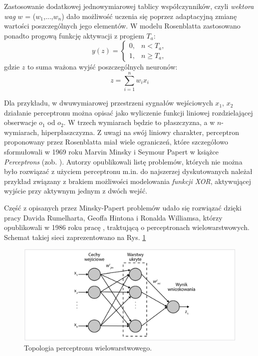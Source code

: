 Zastosowanie dodatkowej jednowymiarowej tablicy współczynników, czyli \textit{wektora wag} $w$ = ($w_1$,...,$w_n$) dało możliwość uczenia się poprzez adaptacyjną zmianę wartości poszczególnych jego elementów. W modelu Rosenblatta zastosowano ponadto progową funkcję aktywacji z progiem $T_a$:
\begin{equation}
y(z)=\begin{cases} 0, & n < T_a, \\ 1, & n \ge T_a, \end{cases}
\end{equation}
gdzie $z$ to suma ważona wyjść poszczególnych neuronów:
\begin{equation}
\label{eqLinActFunc}
z=\sum_{i=1}^{n}w_i x_i
\end{equation}

Dla przykładu, w dwuwymiarowej przestrzeni sygnałów wejściowych {$x_1$, $x_2$}  działanie perceptronu można opisać jako wyliczenie funkcji liniowej rozdzielającej obserwacje $o_1$ od $o_2$. W trzech wymiarach będzie to płaszczyzna, a w $n$-wymiarach, hiperpłaszczyzna. Z uwagi na swój liniowy charakter, perceptron proponowany przez Rosenblatta miał wiele ograniczeń, które szczegółowo sformułowali w 1969 roku Marvin Minsky i Seymour Papert w książce \textit{Perceptrons} (zob. \cite{Minsky1969}). Autorzy opublikowali listę problemów, których nie można było rozwiązać z użyciem perceptronu m.in. do najszerzej dyskutowanych należał przykład związany z brakiem możliwości modelowania \textit{funkcji XOR}, aktywującej wyjście przy aktywnym jednym z dwóch wejść.

Część z opisanych przez Minsky-Papert problemów udało się rozwiązać dzięki pracy Davida Rumelharta, Geoffa Hintona i Ronalda Williamsa, którzy opublikowali w 1986 roku pracę \cite{Rumelhart1986}, traktującą o perceptronach wielowarstwowych. Schemat takiej sieci zaprezentowano na Rys. \ref{MLperceptron}
\begin{figure}[h!]
	\centering
	\includegraphics[width=1\textwidth]{figures/MLperceptron.png}
	\caption{Topologia perceptronu wielowarstwowego.}
	\label{MLperceptron}
\end{figure}

